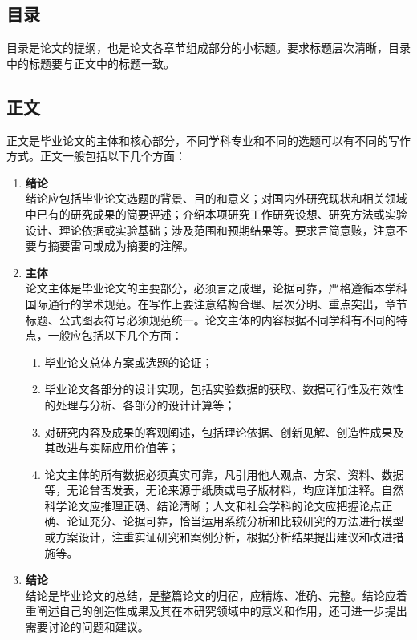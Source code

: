 \subsection{目录}

目录是论文的提纲，也是论文各章节组成部分的小标题。要求标题层次清晰，目录中的标题要与正文中的标题一致。


\subsection{正文}

正文是毕业论文的主体和核心部分，不同学科专业和不同的选题可以有不同的写作方式。正文一般包括以下几个方面：

\begin{enumerate}
    \item \textbf{绪论} \\
          绪论应包括毕业论文选题的背景、目的和意义；对国内外研究现状和相关领域中已有的研究成果的简要评述；介绍本项研究工作研究设想、研究方法或实验设计、理论依据或实验基础；涉及范围和预期结果等。要求言简意赅，注意不要与摘要雷同或成为摘要的注解。
    \item \textbf{主体} \\
          论文主体是毕业论文的主要部分，必须言之成理，论据可靠，严格遵循本学科国际通行的学术规范。在写作上要注意结构合理、层次分明、重点突出，章节标题、公式图表符号必须规范统一。论文主体的内容根据不同学科有不同的特点，一般应包括以下几个方面：
          \begin{enumerate}
              \item 毕业论文总体方案或选题的论证；
              \item 毕业论文各部分的设计实现，包括实验数据的获取、数据可行性及有效性的处理与分析、各部分的设计计算等；
              \item 对研究内容及成果的客观阐述，包括理论依据、创新见解、创造性成果及其改进与实际应用价值等；
              \item 论文主体的所有数据必须真实可靠，凡引用他人观点、方案、资料、数据等，无论曾否发表，无论来源于纸质或电子版材料，均应详加注释。自然科学论文应推理正确、结论清晰；人文和社会学科的论文应把握论点正确、论证充分、论据可靠，恰当运用系统分析和比较研究的方法进行模型或方案设计，注重实证研究和案例分析，根据分析结果提出建议和改进措施等。
          \end{enumerate}
    \item \textbf{结论} \\
          结论是毕业论文的总结，是整篇论文的归宿，应精炼、准确、完整。结论应着重阐述自己的创造性成果及其在本研究领域中的意义和作用，还可进一步提出需要讨论的问题和建议。
\end{enumerate}


